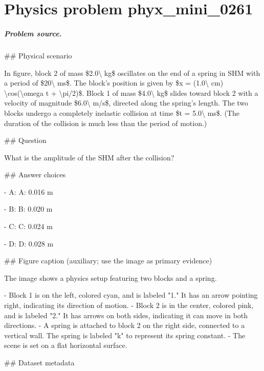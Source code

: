 
\chapter{Physics problem phyx\_mini\_0261}
\label{ch:PhyXMiniProblems_problem_phyx_mini_0261}

\paragraph{Problem source.}
\#\# Physical scenario

In figure, block 2 of mass \$2.0\textbackslash{} kg\$ oscillates on the end of a spring in SHM with a period of \$20\textbackslash{} ms\$. The block's position is given by \$x = (1.0\textbackslash{} cm) \textbackslash{}cos(\textbackslash{}omega t + \textbackslash{}pi/2)\$. Block 1 of mass \$4.0\textbackslash{} kg\$ slides toward block 2 with a velocity of magnitude \$6.0\textbackslash{} m/s\$, directed along the spring's length. The two blocks undergo a completely inelastic collision at time \$t = 5.0\textbackslash{} ms\$. (The duration of the collision is much less than the period of motion.)

\#\# Question

What is the amplitude of the SHM after the collision?

\#\# Answer choices

- A: A: 0.016 m

- B: B: 0.020 m

- C: C: 0.024 m

- D: D: 0.028 m

\#\# Figure caption (auxiliary; use the image as primary evidence)

The image shows a physics setup featuring two blocks and a spring. 

- Block 1 is on the left, colored cyan, and is labeled "1." It has an arrow pointing right, indicating its direction of motion.
- Block 2 is in the center, colored pink, and is labeled "2." It has arrows on both sides, indicating it can move in both directions.
- A spring is attached to block 2 on the right side, connected to a vertical wall. The spring is labeled "k" to represent its spring constant.
- The scene is set on a flat horizontal surface.

\#\# Dataset metadata

